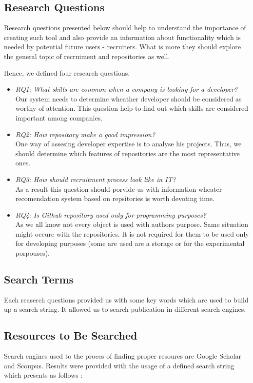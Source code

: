 \documentclass[graybox]{svmult}
\begin{document}
\subsection{Research Questions}
Research questions presented below should help to understand the importance of creating such tool and also provide an information about functionality which is needed by potential future users - recruiters. What is more they should explore the general topic of recruiment and repositories as well.

Hence, we defined four research questions.
\begin{itemize}
  \item \emph{RQ1: What skills are common when a company is looking for a developer?}\\
  Our system needs to determine wheather developer should be considered as worthy of attention. This question help to find out which skills are considered important among companies.
  \item \emph{RQ2: How repository make a good impression?}\\
  One way of assesing developer expertise is to analyse his projects. Thus, we should determine which features of repositories are the most representative ones.
  \item \emph{RQ3: How should recruitment process look like in IT?}\\
  As a result this question should porvide us with information wheater recomendation system based on repsitories is worth devoting time. 
  \item \emph{RQ4: Is Github repository used only for programming purposes?}\\
  As we all know not every object is used with authors purpose. Same situation might occure with the repositories. It is not required for them to be used only for developing purposes (some are used are a storage or for the experimental porpouses).
\end{itemize}

\subsection{Search Terms}
Each reaserch questions provided us with some key words which are used to build up a search string. It allowed us to search publication in different search engines. 


\subsection{Resources to Be Searched}
Search engines used to the proces of finding proper resoures are Google Scholar and Scoupus. Results were provided with the usage of a defined search string which presents as follows :
\end{document}

